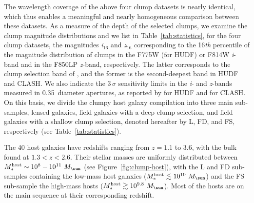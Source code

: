 \documentclass[twocolumn]{aastex61}
\begin{document}
The wavelength coverage of the above four clump datasets is nearly identical, 
which thus enables a meaningful and nearly homogeneous comparison between these 
datasets. As a measure of the depth of the selected clumps, we examine the clump 
magnitude distributions and we list in Table~\ref{tab:statistics}, for the four 
clump datasets, the magnitudes {\it i}$_{16}$ and {\it z}$_{16}$ corresponding to 
the 16{\it th} percentile of the magnitude distribution of clumps
in the F775W (for HUDF) or F814W {\it i}-band and in the F850LP {\it z}-band, 
respectively. The latter corresponds to the clump selection band of 
\citet{guo12}, and the former is the second-deepest band in HUDF and CLASH. We 
also indicate the $3\,\sigma$ sensitivity limits in the {\it i}- and 
{\it z}-bands measured in 0.35\arcsec\ diameter apertures, as reported by 
\citet{beckwith06} for HUDF and \citet{postman12} for CLASH. 
On this basis, we divide the clumpy host galaxy compilation into three main 
sub-samples, lensed galaxies, field galaxies with a deep clump selection, and 
field galaxies with a shallow clump selection, denoted hereafter by L, FD, and 
FS, respectively (see Table~\ref{tab:statistics}). 

The 40 host galaxies have redshifts ranging from $z=1.1$ to 3.6, with the bulk 
found at $1.3<z<2.6$. Their stellar masses are uniformly distributed between 
$M_*^{\rm host} \sim 10^8-10^{11}~M_{\sun}$ (see Figure~\ref{fig:clump-host}), 
with the L and FD sub-samples containing the low-mass host galaxies 
($M_*^{\rm host} \lesssim 10^{10}~M_{\sun}$) and the FS sub-sample the high-mass 
hosts ($M_*^{\rm host} \gtrsim 10^{9.8}~M_{\sun}$). Most of the hosts are on the 
main sequence at their corresponding redshift.

\end{document}
